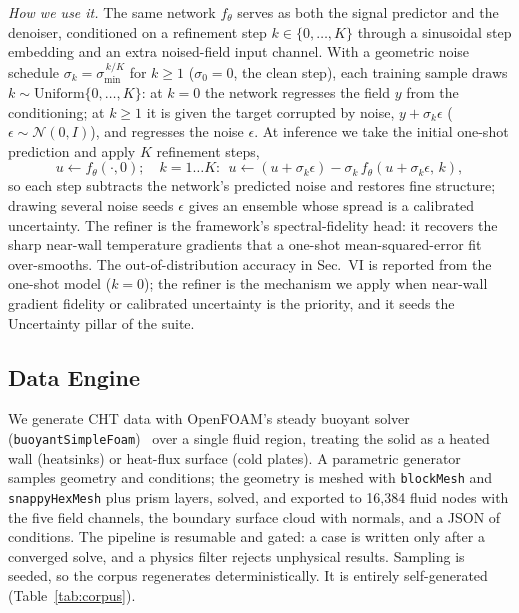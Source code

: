 \documentclass[conference]{IEEEtran}
\begin{document}
\textit{How we use it.} The same network $f_\theta$ serves as both the signal predictor and the
denoiser, conditioned on a refinement step $k\in\{0,\dots,K\}$ through a sinusoidal step embedding and an
extra noised-field input channel. With a geometric noise schedule $\sigma_k=\sigma_{\min}^{\,k/K}$ for $k\ge 1$
($\sigma_0=0$, the clean step), each training sample draws $k\sim\mathrm{Uniform}\{0,\dots,K\}$: at $k{=}0$ the network
regresses the field $y$ from the conditioning; at $k\ge1$ it is given the target corrupted by noise,
$y+\sigma_k\epsilon$ ($\epsilon\sim\mathcal{N}(0,I)$), and regresses the noise $\epsilon$. At inference we
take the initial one-shot prediction and apply $K$ refinement steps,
\begin{equation}
u\leftarrow f_\theta(\cdot,0);\quad k{=}1{\dots}K:\ \ u\leftarrow(u+\sigma_k\epsilon)-\sigma_k\,f_\theta(u+\sigma_k\epsilon,\,k),
\end{equation}
so each step subtracts the network's predicted noise and restores fine structure; drawing several noise
seeds $\epsilon$ gives an ensemble whose spread is a calibrated uncertainty. The refiner is the
framework's spectral-fidelity head: it recovers the sharp near-wall temperature gradients that a one-shot
mean-squared-error fit over-smooths. The out-of-distribution accuracy in Sec.~VI is reported from the
one-shot model ($k{=}0$); the refiner is the mechanism we apply when near-wall gradient fidelity or
calibrated uncertainty is the priority, and it seeds the Uncertainty pillar of the suite.

\subsection{Data Engine}
We generate CHT data with OpenFOAM's steady buoyant solver (\texttt{buoyantSimpleFoam})~\cite{weller} over a single
fluid region, treating the solid as a heated wall (heatsinks) or heat-flux surface (cold plates). A
parametric generator samples geometry and conditions; the geometry is meshed with \texttt{blockMesh}
and \texttt{snappyHexMesh} plus prism layers, solved, and exported to 16{,}384 fluid nodes with the
five field channels, the boundary surface cloud with normals, and a JSON of conditions. The pipeline
is resumable and gated: a case is written only after a converged solve, and a physics filter rejects
unphysical results. Sampling is seeded, so the corpus regenerates deterministically. It is entirely
self-generated (Table~\ref{tab:corpus}).
\end{document}
